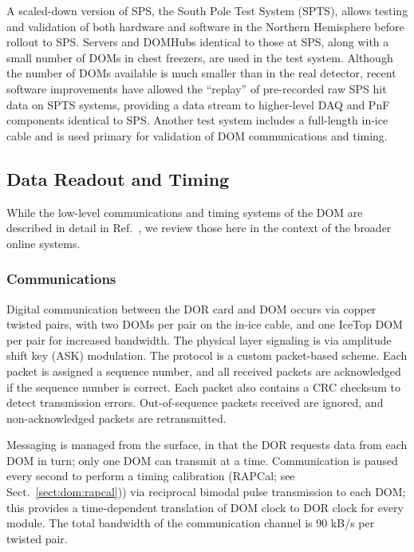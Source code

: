 A scaled-down version of SPS, the South Pole Test System (SPTS), allows
testing and validation of both hardware and software in the Northern
Hemisphere before rollout to SPS.  Servers and DOMHubs identical to those
at SPS, along with a small number of DOMs in chest freezers, are used in
the test system.  Although the number of DOMs available is much smaller
than in the real detector, recent software improvements have allowed the
``replay'' of pre-recorded raw SPS hit data on SPTS systems, providing a data stream to
higher-level DAQ and PnF components identical to SPS.  Another test system
includes a full-length in-ice cable and is used primary for validation of
DOM communications and timing.

\subsection{Data Readout and Timing}

While the low-level communications and timing systems of the DOM are
described in detail in Ref.~\cite{ref:domdaq}, we review those here in the
context of the broader online systems.

\subsubsection{\label{sect:online:comms}Communications}

Digital communication between the DOR card and DOM occurs via copper
twisted pairs, with two DOMs per pair on the in-ice cable, and one IceTop
DOM per pair for increased bandwidth.  The physical
layer signaling is via amplitude shift key (ASK) modulation.  The protocol
is a custom packet-based scheme.  Each packet is assigned a sequence 
number, and all received packets are acknowledged if the sequence number is
correct.  Each packet also contains a CRC checksum to detect transmission
errors.  Out-of-sequence packets received are ignored, and non-acknowledged
packets are retransmitted.  

Messaging is managed from the surface, in that the DOR requests data
from each DOM in turn; only one DOM can transmit at a time.  Communication
is paused every second to perform a timing calibration (RAPCal; see
Sect.~\ref{sect:dom:rapcal})) via reciprocal bimodal pulse transmission to
each DOM; this provides a time-dependent translation of DOM clock to DOR
clock for every module.  The total bandwidth of the communication channel
is 90 kB/s per twisted pair.   

